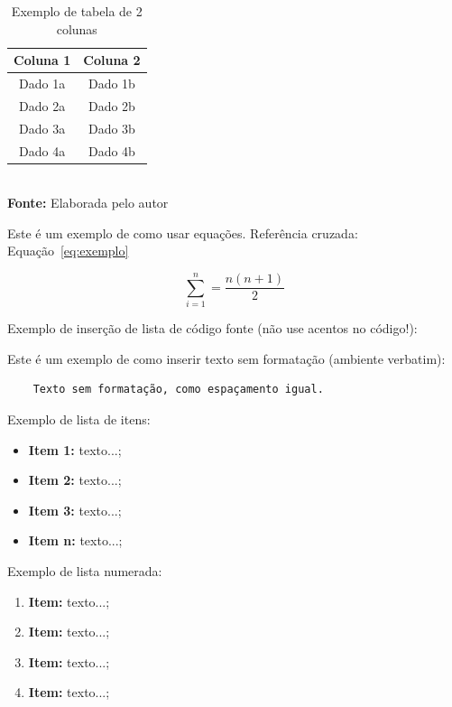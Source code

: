 \documentclass[
	article,			%
	11pt,				%
	oneside,			%
	a4paper,			%
	chapter=TITLE,		%
	section=TITLE,		%
	english,			%
	brazil,				%
	sumario=tradicional
]{abntex2}
\begin{document}
	\FloatBarrier
	\begin{table}[!htbp]
		\centering
		\caption{Exemplo de tabela de 2 colunas}
		\begin{tabular}{ c | c }
			\hline
			\textbf{Coluna 1} & \textbf{Coluna 2} \\ \hline
			Dado 1a           & Dado 1b           \\ \hline
			Dado 2a           & Dado 2b           \\ \hline
			Dado 3a           & Dado 3b           \\ \hline
			Dado 4a           & Dado 4b           \\ \hline
		\end{tabular}
		\\ \vspace{0.2cm}
		\textbf{Fonte:} Elaborada pelo autor
		\label{tab:exemplo}
	\end{table}
	\FloatBarrier
	
	
	Este é um exemplo de como usar equações. Referência cruzada: Equação~\ref{eq:exemplo}
	
	\begin{equation}
	\sum_{i=1}^{n} = \frac{n(n+1)}{2}
	\label{eq:exemplo}
	\end{equation}
	
	
	Exemplo de inserção de lista de código fonte (não use acentos no código!):
	
	 
	
	
	
	Este é um exemplo de como inserir texto sem formatação (ambiente verbatim):
	
	\begin{verbatim}
	Texto sem formatação, como espaçamento igual.
	\end{verbatim}
	
	
	Exemplo de lista de itens:
	
	\begin{itemize}
		\item \textbf{Item 1:} texto...;
		\item \textbf{Item 2:} texto...;
		\item \textbf{Item 3:} texto...;
		\item \textbf{Item n:} texto...;
	\end{itemize}
	
	
	Exemplo de lista numerada:
	
	\begin{enumerate}
		\item \textbf{Item:} texto...;
		\item \textbf{Item:} texto...;
		\item \textbf{Item:} texto...;
		\item \textbf{Item:} texto...;
	\end{enumerate}
	
\end{document}
